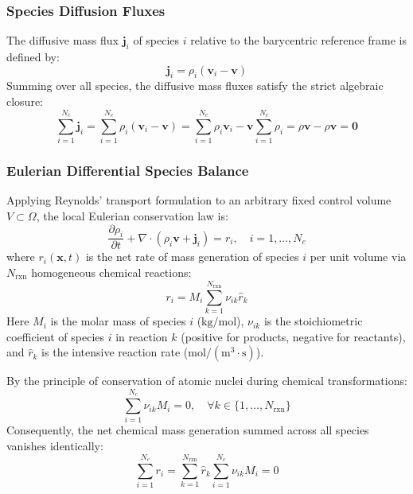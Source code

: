 \documentclass[11pt,a4paper]{article}
\begin{document}
\subsubsection{Species Diffusion Fluxes}
The diffusive mass flux $\mathbf{j}_i$ of species $i$ relative to the barycentric reference frame is defined by:
\begin{equation}
\mathbf{j}_i = \rho_i (\mathbf{v}_i - \mathbf{v})
\end{equation}
Summing over all species, the diffusive mass fluxes satisfy the strict algebraic closure:
\begin{equation}
\sum_{i=1}^{N_c} \mathbf{j}_i = \sum_{i=1}^{N_c} \rho_i (\mathbf{v}_i - \mathbf{v}) = \sum_{i=1}^{N_c} \rho_i \mathbf{v}_i - \mathbf{v} \sum_{i=1}^{N_c} \rho_i = \rho \mathbf{v} - \rho \mathbf{v} = \mathbf{0}
\end{equation}

\subsubsection{Eulerian Differential Species Balance}
Applying Reynolds' transport formulation to an arbitrary fixed control volume $V \subset \Omega$, the local Eulerian conservation law is:
\begin{equation}
\frac{\partial \rho_i}{\partial t} + \nabla \cdot \left( \rho_i \mathbf{v} + \mathbf{j}_i \right) = r_i, \quad i = 1, \dots, N_c
\end{equation}
where $r_i(\mathbf{x}, t)$ is the net rate of mass generation of species $i$ per unit volume via $N_{\text{rxn}}$ homogeneous chemical reactions:
\begin{equation}
r_i = M_i \sum_{k=1}^{N_{\text{rxn}}} \nu_{ik} \hat{r}_k
\end{equation}
Here $M_i$ is the molar mass of species $i$ ($\text{kg/mol}$), $\nu_{ik}$ is the stoichiometric coefficient of species $i$ in reaction $k$ (positive for products, negative for reactants), and $\hat{r}_k$ is the intensive reaction rate ($\text{mol}/(\text{m}^3\cdot\text{s})$).

By the principle of conservation of atomic nuclei during chemical transformations:
\begin{equation}
\sum_{i=1}^{N_c} \nu_{ik} M_i = 0, \quad \forall k \in \{1, \dots, N_{\text{rxn}}\}
\end{equation}
Consequently, the net chemical mass generation summed across all species vanishes identically:
\begin{equation}
\sum_{i=1}^{N_c} r_i = \sum_{k=1}^{N_{\text{rxn}}} \hat{r}_k \sum_{i=1}^{N_c} \nu_{ik} M_i = 0
\end{equation}
\end{document}
